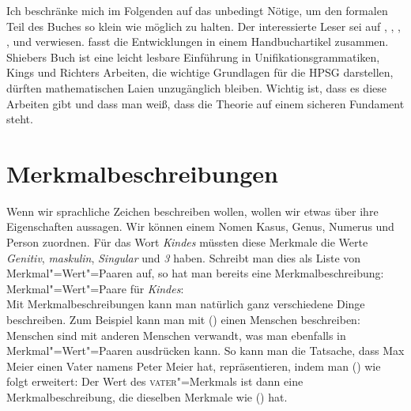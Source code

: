 Ich beschränke mich im Folgenden auf das unbedingt Nötige, um den formalen Teil
des Buches so klein wie möglich zu halten. Der interessierte Leser sei auf
\citet{Shieber86a}, \citet[Kapitel~2]{ps}, \citet{Johnson88}, \citet{Carpenter92a},
\citet{King94a} und \citet{Richter2004a-u} verwiesen. \citet{Richter2024a} fasst die Entwicklungen
in einem Handbuchartikel zusammen. Shiebers Buch ist
eine leicht lesbare Einführung in Unifikationsgrammatiken, Kings und Richters Arbeiten, die wichtige Grundlagen
für die HPSG darstellen, dürften mathematischen Laien unzugänglich bleiben.
Wichtig ist, dass es diese Arbeiten gibt und dass man weiß, dass die Theorie
auf einem sicheren Fundament steht.

\section{Merkmalbeschreibungen}

Wenn wir sprachliche Zeichen beschreiben wollen, wollen wir etwas über ihre Eigenschaften
aussagen. Wir können \zb einem Nomen Kasus, Genus, Numerus und Person zuordnen. Für das
Wort \emph{Kindes} müssten diese Merkmale die Werte \emph{Genitiv}, \emph{maskulin}, \emph{Singular} und \emph{3} haben.
Schreibt man dies als Liste von Merkmal"=Wert"=Paaren auf, so hat man bereits eine Merkmalbeschreibung:
\ea
Merkmal"=Wert"=Paare für \emph{Kindes}:\\
\z
Mit Merkmalbeschreibungen kann man natürlich ganz verschiedene Dinge beschreiben. Zum Beispiel kann
man mit () einen Menschen beschreiben:
\ea
{}
\z
Menschen sind mit anderen Menschen verwandt, was man ebenfalls in Merkmal"=Wert"=Paaren
ausdrücken kann. So kann man \zb die Tatsache, dass Max Meier einen Vater namens Peter
Meier hat, repräsentieren, indem man () wie folgt erweitert:
\ea
{}
\z
Der Wert des \textsc{vater}"=Merkmals ist dann eine Merkmalbeschreibung, die dieselben Merkmale
wie () hat.

